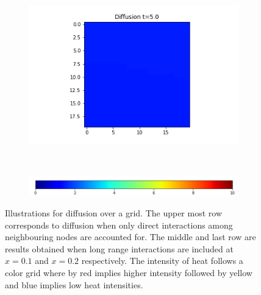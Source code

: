 \documentclass[10pt,a4paper]{article}
\begin{document}
\begin{figure}[!h]
\begin{subfigure}[b]{0.25\textwidth}
	\end{subfigure}~
	\begin{subfigure}[b]{0.25\textwidth}
		\includegraphics[width= \textwidth]{images/grid-t5-x02.png}
	\end{subfigure}\\
\vspace{0.25cm}
	 \begin{subfigure}[b]{0.60\textwidth}
	 	\includegraphics[width= \textwidth]{images/colour-bar-grid.png}
	 \end{subfigure}
\caption{Illustrations for diffusion over a grid. The upper most row corresponds to diffusion when only direct interactions among neighbouring nodes are accounted for. The middle and last row are results obtained when long range interactions are included at $x=0.1$ and $x=0.2$ respectively. The intensity of heat follows a color grid where by red implies higher intensity followed by yellow and blue implies low heat intensities.}
\label{diffusionongrid}
\end{figure}
\end{document}
